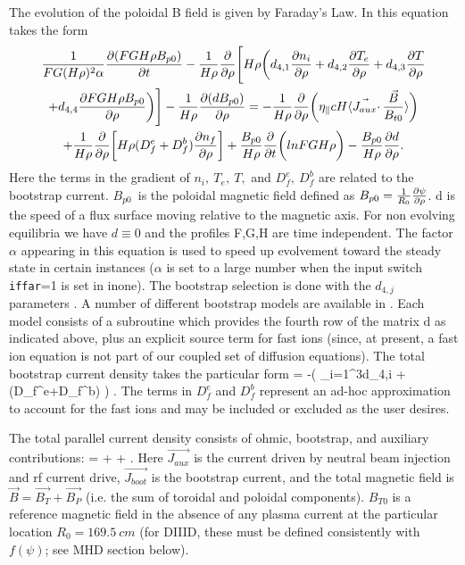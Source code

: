The evolution of the poloidal B field is given by Faraday's Law. In \ot this
equation takes the form
\begin{multline}
 \frac {1}{ FG(H\rho)^2\alpha}\frac{\partial{ (FGH\rho B_{p0})}}{\partial{ t}} 
 -\frac{1}{ H\rho}\frac{\partial{  }}{\partial{ \rho}}
 \Bigg [H\rho \bigg (d_{4,1}\frac{\partial{ n_i}}{\partial{ \rho}} +d_{4,2}\frac{\partial{ T_e}}{\partial{ \rho}} 
  +d_{4,3}\frac{\partial{ T}}{\partial{ \rho}} \\  
  +d_{4,4}\frac{\partial{ FGH\rho B_{p0}}}{\partial{ \rho}} \bigg)\Bigg]
 -\frac{1}{H\rho}\frac{\partial{ (dB_{p0})}}{\partial{ \rho}}   
 =-\frac{1}{ H\rho}\frac{\partial{  }}{\partial{ \rho}} 
  \bigg (\eta_{\parallel} c H
   \langle {\vec {J_{aux}}} \cdotp \frac{\vec {B}}{ B_{t0}}\rangle \bigg)\\
 +\frac{1}{ H\rho} \frac{\partial{  }}{\partial{ \rho}} 
  \bigg [H\rho(D_f^e +D_f^b)\frac{\partial{  n_f}}{\partial{ \rho}}  \bigg]
 +\frac{B_{p0}}{ H\rho } \frac{\partial{  }}{\partial{ t}} \bigg( lnFGH\rho \bigg)
-\frac{B_{p0}}{ H\rho } \frac{\partial{ d}}{\partial{ \rho}} \label{eq:fday1_1}.
\end{multline}                                 
Here the terms in the gradient of $n_i,\ T_e,\ T,$ and $D_f^e,\  D_f^b $ are
related to the bootstrap current.  $B_{p0}$\ is the  poloidal magnetic field
defined as
\mbox{$B_{p0} = \frac{1}{ R_0}\frac{\partial{ \psi }}{\partial{ \rho}} $.} 
d is the speed of a flux surface moving relative to the magnetic axis. For non
evolving equilibria we have $ d \equiv 0 $ and the profiles F,G,H are time
independent. The factor $\alpha$ appearing  in this equation is used to speed up
evolvement toward the steady state in certain instances ($\alpha$ is set to a
large number when the input switch \texttt{iffar}=1 is set in inone). The
bootstrap selection is done with the $d_{4,j}$ parameters . A number of
different bootstrap models are available in \ot. Each model consists of a
subroutine which provides the fourth row of the matrix d as indicated above, 
plus an explicit source term  for fast ions (since, at present, a fast ion
equation is not part of our coupled set of diffusion equations). The total
bootstrap current density takes the particular form
\beq
 \left \langle {} 
 \right \rangle =
 -\left (
 \sum_{i=1}^{3}d_{4,i}
 + (D_f^e+D_f^b) \right ) \label{eq:bootdef}.
\eeq
The terms in $D_f^e $ and $D_f^b$ represent an  ad-hoc approximation to account
for the fast ions and may be included or excluded as the user desires.

The total parallel current density  consists of ohmic, bootstrap, and auxiliary
contributions:
\beq
 \bigg \langle {}
  \bigg \rangle =
 \left \langle {} {}
  \right \rangle +
 \left \langle {} {}
  \right \rangle +
 \left \langle {} {}
  \right \rangle    \label{eq:jtot}.
\eeq
Here $\vec{J_{aux}}$ is the current driven by neutral beam injection and rf
current drive, $\vec{J_{boot}}$ is the bootstrap current, and the total magnetic
field is $\vec{B}=\vec{B_T}+\vec{B_P}$ (i.e. the sum of toroidal and poloidal
components). $B_{T0}$ is a reference magnetic field in the absence of any 
plasma current at the particular location $R_0 =169.5\ cm$ (for DIIID, these
must be defined consistently with $f(\psi)$; see MHD section below).

